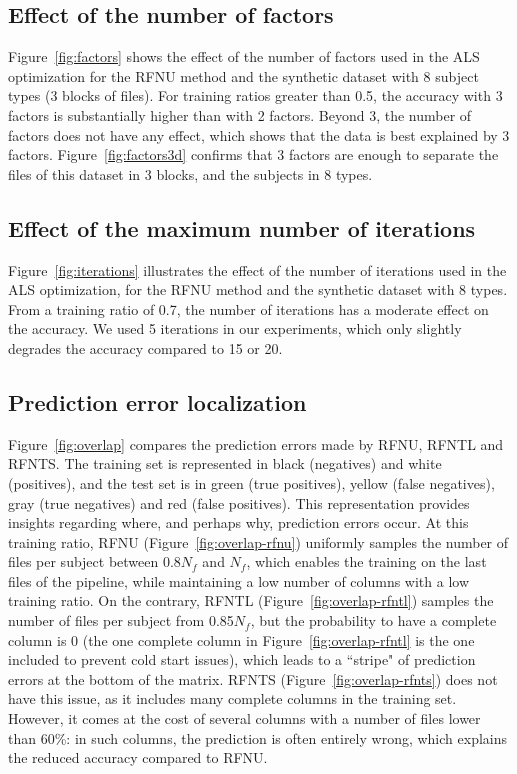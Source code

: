 \documentclass[10pt, conference, compsocconf]{IEEEtran}
\begin{document}
\subsection{Effect of the number of factors} Figure~\ref{fig:factors} 
shows the effect of the number of factors used in the ALS optimization 
for the RFNU method and the synthetic dataset with 8 subject types (3 
blocks of files). For training ratios greater than 0.5, the accuracy 
with 3 factors is substantially higher than with 2 factors. Beyond 3, 
the number of factors does not have any effect, which shows that the 
data is best 
explained by 3 factors. Figure~\ref{fig:factors3d} confirms that 3 
factors are enough to separate the files of this dataset in 3 
blocks, and the subjects in 8 types.

\subsection{Effect of the maximum number of iterations}
Figure~\ref{fig:iterations} illustrates the effect of the number of 
iterations used in the ALS optimization, for the 
RFNU method and the synthetic dataset with 8 types. 
From a training ratio of 0.7, the number of iterations has a moderate 
effect on the accuracy. We used 5 iterations in our experiments, 
which only slightly degrades the accuracy compared to 15 or 20.

\subsection{Prediction error localization}

Figure~\ref{fig:overlap} compares the prediction errors made by RFNU, 
RFNTL and RFNTS. The training set is represented
in black (negatives) and white (positives), and the test set is in green 
(true positives), yellow (false negatives), gray (true negatives) and 
red (false positives). This representation provides insights regarding 
where, and perhaps why, prediction errors 
occur. At this training ratio, RFNU (Figure~\ref{fig:overlap-rfnu}) 
uniformly samples the number of files per subject between 0.8$N_f$ and 
$N_f$, which enables the training on the last 
files of the pipeline, while maintaining a low number of columns with 
a low training ratio. On the contrary, RFNTL 
(Figure~\ref{fig:overlap-rfntl}) samples the number of files per 
subject from 0.85$N_f$, but the probability to have a complete column 
is 0 (the one complete column in Figure~\ref{fig:overlap-rfntl} is the 
one included to prevent cold start issues), which leads to a ``stripe" 
of prediction errors at the bottom of the matrix. RFNTS 
(Figure~\ref{fig:overlap-rfnts}) does not have this issue, as it 
includes many complete columns in the training set. However, it comes at 
the cost of several columns with a number of files lower than 
60\%: in such columns, the prediction is often entirely wrong, which explains
the reduced accuracy compared to RFNU.
\end{document}
